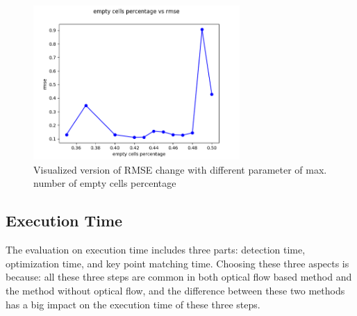 \documentclass{easychair}
\begin{document}
\begin{figure}
	
	\centering
	\includegraphics[width=0.7\textwidth]{img/max_num_empty_cell1.png}
	\caption{Visualized version of RMSE change with different parameter of max. number of empty cells percentage}
	\label{fig:max_empty_cell}
	
\end{figure}


\subsection{Execution Time}
The evaluation on execution time includes three parts: detection time, optimization time, and key point matching time. Choosing these three aspects is because: all these three steps are common in both optical flow based method and the method without optical flow, and the difference between these two methods has a big impact on the execution time of these three steps.

\end{document}

